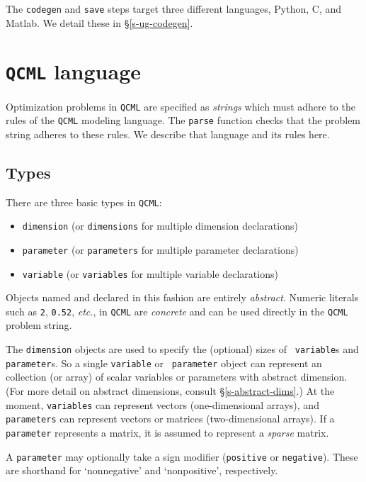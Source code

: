 \documentclass[11pt]{article}
\def\qcml{\texttt{QCML}\xspace}
\newcommand{\etc}{{\it etc.}}
\begin{document}
The {\tt codegen} and {\tt save} steps target three different languages, 
Python, C, and Matlab. We detail these in \S\ref{s-ug-codegen}.

\section{\qcml language}
\label{s-ug-language}
Optimization problems in \qcml are specified as \emph{strings} which must adhere to 
the rules of the \qcml modeling language. The {\tt parse} function checks that
the problem string adheres to these rules. We describe that language and its
rules here.

\subsection{Types}
There are three basic types in \qcml:
\begin{itemize}
\item {\tt dimension} (or {\tt dimensions} for multiple dimension declarations)
\item {\tt parameter} (or {\tt parameters} for multiple parameter declarations)
\item {\tt variable} (or {\tt variables} for multiple variable declarations)
\end{itemize}
Objects named and declared in this fashion are entirely \emph{abstract}.
Numeric literals such as {\tt 2}, {\tt 0.52}, \etc, in \qcml are
\emph{concrete} and can be used directly in the \qcml problem string. 

The {\tt dimension} objects are used to specify the (optional) sizes of {\tt
variable}s and {\tt parameter}s. So a single {\tt variable} or {\tt
parameter} object can represent an collection (or array) of scalar variables
or parameters with abstract dimension. (For more detail on abstract
dimensions, consult \S\ref{s-abstract-dims}.) At the moment, {\tt variables}
can represent vectors (one-dimensional arrays), and {\tt parameters} can
represent vectors or matrices (two-dimensional arrays). If a {\tt parameter}
represents a matrix, it is assumed to represent a \emph{sparse} matrix.

A {\tt parameter} may optionally take a sign modifier ({\tt positive} or 
{\tt negative}). These are shorthand for `nonnegative' and `nonpositive', 
respectively.
\end{document}
